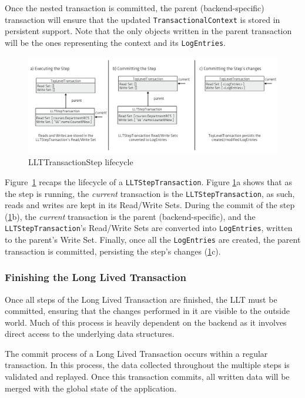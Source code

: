 \documentclass{llncs}
\begin{document}
Once the nested transaction is committed, the parent
(backend-specific) transaction will ensure that the updated
\texttt{TransactionalContext} is stored in persistent support. Note
that the only objects written in the parent transaction will be the
ones representing the context and its \texttt{LogEntries}.

\begin{figure}
\centering
\includegraphics[width=.9\linewidth]{llt-step-lifecycle}
\caption{LLTTransactionStep lifecycle}
\label{fig:llt-lifecycle}
\end{figure}

Figure~\ref{fig:llt-lifecycle} recaps the lifecycle of a
\texttt{LLTStepTransaction}. Figure \ref{fig:llt-lifecycle}a shows
that as the step is running, the {\it current} transaction is the
\texttt{LLTStepTransaction}, as such, reads and writes are kept in its
Read/Write Sets. During the commit of the step
(\ref{fig:llt-lifecycle}b), the {\it current} transaction is the
parent (backend-specific), and the \texttt{LLTStepTransaction}'s
Read/Write Sets are converted into \texttt{LogEntries}, written to the
parent's Write Set. Finally, once all the \texttt{LogEntries} are
created, the parent transaction is committed, persisting the step's
changes (\ref{fig:llt-lifecycle}c).

\subsubsection{Finishing the Long Lived Transaction}
\label{sec:jvstm-commit}

Once all steps of the Long Lived Transaction are finished, the LLT
must be committed, ensuring that the changes performed in it are
visible to the outside world. Much of this process is heavily
dependent on the backend as it involves direct access to the
underlying data structures.

The commit process of a Long Lived Transaction occurs within a regular
transaction. In this process, the data collected throughout the
multiple steps is validated and replayed. Once this transaction
commits, all written data will be merged with the global state of the
application.
\end{document}
